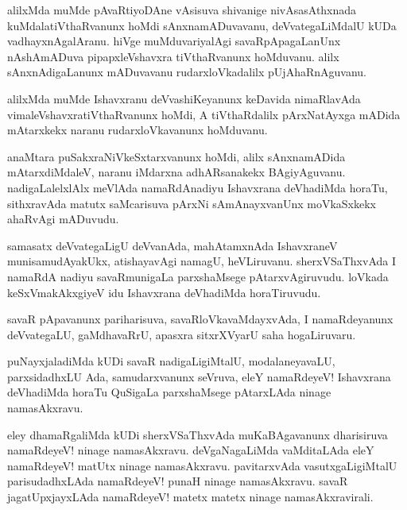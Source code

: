 \documentclass{article}
\begin{document}
\begin{mn}
alilxMda muMde pAvaRtiyoDAne vAsisuva shivanige  nivAsasAthxnada kuMdalatiVthaRvanunx hoMdi 
sAnxnamADuvavanu, deVvategaLiMdalU kUDa vadhayxnAgalAranu. hiVge muMduvariyalAgi  savaRpApagaLanUnx
nAshAmADuva pipapxleVshavxra tiVthaRvanunx hoMduvanu. alilx sAnxnAdigaLanunx mADuvavanu 
rudarxloVkadalilx pUjAhaRnAguvanu.
\end{mn}

\begin{mn}
alilxMda muMde Ishavxranu deVvashiKeyanunx keDavida nimaRlavAda vimaleVshavxratiVthaRvanunx 
hoMdi, A tiVthaRdalilx pArxNatAyxga mADida mAtarxkekx naranu rudarxloVkavanunx hoMduvanu.
\end{mn}

\begin{mn}
anaMtara puSakxraNiVkeSxtarxvanunx hoMdi, alilx sAnxnamADida mAtarxdiMdaleV, naranu iMdarxna 
adhARsanakekx BAgiyAguvanu. nadigaLalelxlAlx meVlAda namaRdAnadiyu Ishavxrana deVhadiMda
horaTu, sithxravAda matutx saMcarisuva pArxNi sAmAnayxvanUnx moVkaSxkekx ahaRvAgi mADuvudu.
\end{mn}

\begin{mn}
samasatx deVvategaLigU deVvanAda, mahAtamxnAda IshavxraneV  munisamudAyakUkx, atishayavAgi namagU,
heVLiruvanu. sherxVSaThxvAda I namaRdA nadiyu savaRmunigaLa parxshaMsege pAtarxvAgiruvudu. 
loVkada keSxVmakAkxgiyeV idu Ishavxrana deVhadiMda horaTiruvudu.
\end{mn}

\begin{mn}
savaR pApavanunx pariharisuva, savaRloVkavaMdayxvAda, I namaRdeyanunx deVvategaLU, gaMdhavaRrU,
apasxra sitxrXVyarU saha hogaLiruvaru.
\end{mn}

\begin{mn}
puNayxjaladiMda kUDi savaR nadigaLigiMtalU, modalaneyavaLU, parxsidadhxLU Ada, samudarxvanunx 
seVruva, eleY namaRdeyeV! Ishavxrana deVhadiMda horaTu QuSigaLa parxshaMsege pAtarxLAda ninage 
namasAkxravu.
\end{mn}

\begin{mn}
eley dhamaRgaliMda kUDi sherxVSaThxvAda muKaBAgavanunx dharisiruva namaRdeyeV! ninage 
namasAkxravu. deVgaNagaLiMda vaMditaLAda eleY namaRdeyeV! matUtx ninage namasAkxravu. 
pavitarxvAda vasutxgaLigiMtalU parisudadhxLAda namaRdeyeV! punaH ninage namasAkxravu. 
savaR jagatUpxjayxLAda namaRdeyeV! matetx matetx ninage namasAkxravirali.
\end{mn}
\end{document}
